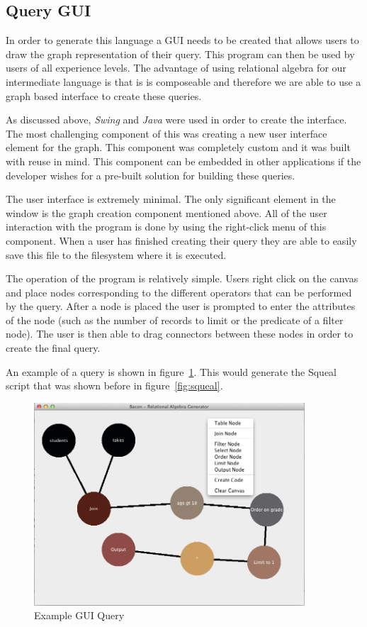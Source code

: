 \subsection{Query GUI}

In order to generate this language a \ac{GUI} needs to be created that allows
users to draw the graph representation of their query. This program can then be
used by users of all experience levels. The advantage of using relational
algebra for our intermediate language is that is is composeable and therefore
we are able to use a graph based interface to create these queries.

As discussed above, \emph{Swing} and \emph{Java} were used in order to create
the interface. The most challenging component of this was creating a new user
interface element for the graph. This component was completely custom and it
was built with reuse in mind. This component can be embedded in other
applications if the developer wishes for a pre-built solution for building
these queries.

The user interface is extremely minimal. The only significant element in the
window is the graph creation component mentioned above. All of the user
interaction with the program is done by using the right-click menu of this
component. When a user has finished creating their query they are able to
easily save this file to the filesystem where it is executed.

The operation of the program is relatively simple. Users right click on the
canvas and place nodes corresponding to the different operators that can be
performed by the query. After a node is placed the user is prompted to enter
the attributes of the node (such as the number of records to limit or the
predicate of a filter node). The user is then able to drag connectors between
these nodes in order to create the final query.

An example of a query is shown in figure~\ref{fig:bacon}. This would generate
the Squeal script that was shown before in figure~\ref{fig:squeal}.

\begin{figure}
  \centering
  \includegraphics[width=0.9\textwidth]{images/bacon}
  \caption{Example GUI Query}
  \label{fig:bacon}
\end{figure}
